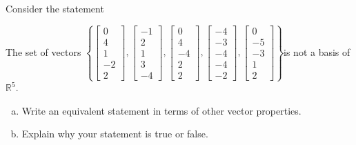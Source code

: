 
\begin{exerciseStatement}


Consider the statement 
\begin{center}\begin{minipage}{0.8\textwidth}
 The set of vectors \( \left\{ \left[\begin{array}{c}
0 \\
4 \\
1 \\
-2 \\
2
\end{array}\right] , \left[\begin{array}{c}
-1 \\
2 \\
1 \\
3 \\
-4
\end{array}\right] , \left[\begin{array}{c}
0 \\
4 \\
-4 \\
2 \\
2
\end{array}\right] , \left[\begin{array}{c}
-4 \\
-3 \\
-4 \\
-4 \\
-2
\end{array}\right] , \left[\begin{array}{c}
0 \\
-5 \\
-3 \\
1 \\
2
\end{array}\right] \right\} \)is not a basis of \(\mathbb{R}^5\). 
\end{minipage}\end{center}
    


\begin{enumerate}[(a)]
\item  Write an equivalent statement in terms of other vector properties.
\item  Explain why your statement is true or false.
\end{enumerate}
    
\end{exerciseStatement}
    
